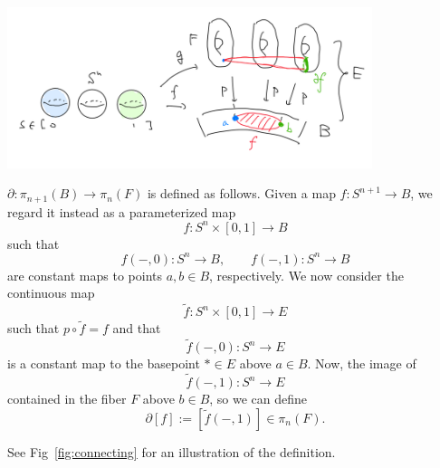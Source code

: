 \documentclass[12pt]{article}
\numberwithin{equation}{section}
\theoremstyle{remark}
\renewenvironment{figure}[1][]{
  \begin{originalfigure}[#1]
    \begin{mdframed}[linecolor=black!0,backgroundcolor=black!1]
}{
    \end{mdframed}
  \end{originalfigure}
}
\begin{document}
\begin{figure}[h]
  \centering
  \includegraphics[width=0.8\textwidth]{connecting.png}
  \caption{The connecting map $\partial$}
  \label{fig:connecting}
\end{figure}
\begin{definition}
  \label{def:connecting-map-homotopy}
  $\partial:\pi_{n+1}(B)\to \pi_{n}(F)$ is defined as follows.
  Given a map $f:S^{n+1}\to B$, we regard it instead as a parameterized map
  \begin{equation}
  f: S^n\times [0,1] \to B
  \end{equation} such that \begin{equation}
    f(-,0):S^n\to B,\qquad
    f(-,1):S^n\to B
  \end{equation}
  are constant maps to points $a,b\in B$, respectively.
  We now consider the continuous map \begin{equation}
    \tilde f:S^n\times [0,1]\to E
  \end{equation}
  such that $p\circ \tilde f=f$ and that \begin{equation}
    \tilde f(-,0): S^n\to E
  \end{equation} is a constant map to the basepoint $*\in E$ above $a\in B$.
  Now, the image of  \begin{equation}
    \tilde f(-,1): S^n\to E
  \end{equation} contained in the fiber $F$ above $b\in B$,
  so we can define \begin{equation}
    \partial [f] := [\tilde f(-,1)]\in \pi_n(F).
  \end{equation}
\end{definition}
See Fig~\ref{fig:connecting} for an illustration of the definition.
\end{document}
